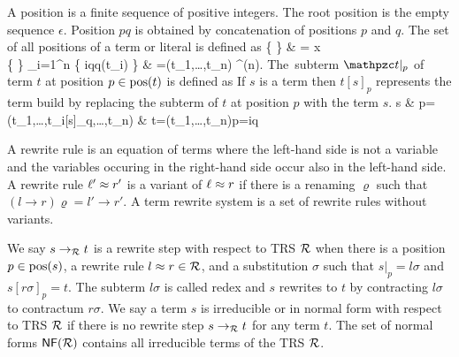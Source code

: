 \begin{definition}\label{def:position}
	A {\myem position} is a finite sequence of positive integers.
	The root position is the empty sequence $\epsilon$.
	Position $pq$ is obtained by concatenation of positions $p$ and $q$.
	The set of all positions of a term or literal is defined as 
	\DEFINE{ 
		\pos(\mct) }
	{
		\{ \epsilon \} 		
		& \mct = x \in \mcV \\
%		
		\{ \epsilon \} \cup \bigcup_{i=1}^{n} \{ iq\mid q\in\pos(t_i) \}	
		& \mct=\mcf(t_1,\ldots,t_n) \mcf\in\mcF^{(n)}.
	}
The~{\myem subterm} $\mct|_p$ of term $t$ {\myem at position} $p\in\operatorname{pos}(t)$ is defined as
%
%
If $s$ is a term then $t[s]_p$ represents the term build by replacing the subterm of $t$ at position $p$ with the term $s$.
{
	s 		& p=\epsilon \\
	\mf(t_1,\ldots,t_i[s]_q,\ldots,t_n)	& t=\mf(t_1,\ldots,t_n)p=iq
}
\end{definition}

\begin{definition}
	A {\myem rewrite rule} is an equation of terms where the left-hand side is not a variable
	and the variables occuring in the right-hand side occur also in the left-hand side.
	A rewrite rule $\ell'\approx r'$ is a {\myem variant} of $\ell\approx r$ if there is a renaming $\varrho$
	such that 
	$(l\rightarrow r)\varrho = l'\rightarrow r'$.
	A {\myem term rewrite system} is a set of rewrite rules without variants.

	We say $s\rightarrow_{\mathcal R} t$ is a 
	{\myem rewrite step} 
	 with respect to TRS ${\mathcal R}$ 
	when there is a position $p \in \operatorname{pos}(s)$, 
	a rewrite rule $l\approx r\in{\mathcal R}$, 
	and a substitution $\sigma$ such that
	$s|_p=l\sigma$ and $s[r\sigma]_p = t$.
		The subterm $l\sigma$ is called {\myem redex} and
	$s$ rewrites to $t$ by {\myem contracting} $l\sigma$ to {\myem contractum} $r\sigma$.
	We say a term $s$ is {\myem irreducible} or in {\myem normal form} with respect to TRS ${\mathcal R}$ if there is no rewrite step $s\rightarrow_{\mathcal R} t$ for any term $t$. 
	The set of normal forms $\mathsf{NF}({\mathcal R})$ contains all irreducible terms of the TRS ${\mathcal R}$.
	\end{definition}

